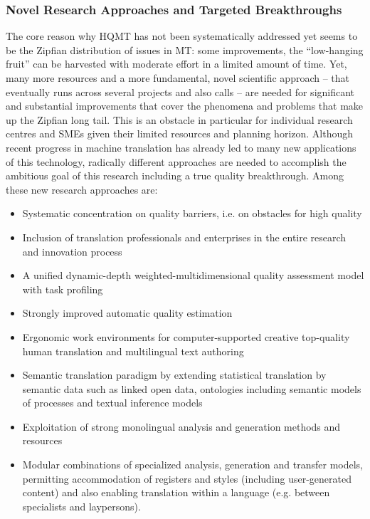 \documentclass[10pt, plain]{../../metanetpaper}
\begin{document}
\begin{multicols}{2}
\subsubsection{Novel Research Approaches and Targeted Breakthroughs}
\label{sec:novel-rese-appr-pt1}

The core reason why HQMT has not been systematically addressed yet seems to be the Zipfian distribution of issues in MT: some improvements, the “low-hanging fruit” can be harvested with moderate effort in a limited amount of time. Yet, many more resources and a more fundamental, novel scientific approach -- that eventually runs across several projects and also calls -- are needed for significant and substantial improvements that cover the phenomena and problems that make up the Zipfian long tail. This is an obstacle in particular for individual research centres and SMEs given their limited resources and planning horizon.
Although recent progress in machine translation has already led to many new applications of this technology, radically different approaches are needed to accomplish the ambitious goal of this research including a true quality breakthrough. Among these new research approaches are:

\begin{itemize}
\item Systematic concentration on quality barriers, i.e. on obstacles for high quality
\item Inclusion of translation professionals and enterprises in the entire research and innovation process
\item A unified dynamic-depth weighted-multidimensional quality assessment model with task profiling
\item Strongly improved automatic quality estimation
\item Ergonomic work environments for computer-supported creative top-quality human translation and multilingual text authoring
\item Semantic translation paradigm by extending statistical translation by semantic data such as linked open data, ontologies including semantic models of processes and textual inference models
\item Exploitation of strong monolingual analysis and generation methods and resources
\item Modular combinations of specialized analysis, generation and transfer models, permitting accommodation of registers and styles (including user-generated content) and also enabling translation within a language (e.g. between specialists and laypersons).
\end{itemize}


\end{multicols}
\end{document}
